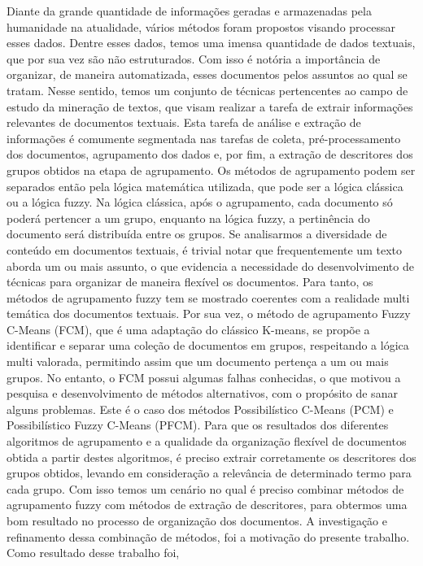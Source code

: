 Diante da grande quantidade de informações geradas e armazenadas pela humanidade na atualidade, 
vários métodos foram propostos visando processar esses dados. Dentre esses dados, temos uma imensa
quantidade de dados textuais, que por sua vez são não estruturados. Com isso é notória a importância de organizar, de maneira automatizada, esses documentos pelos assuntos ao qual se tratam. Nesse sentido, temos um conjunto de técnicas pertencentes ao campo de estudo da mineração de textos, que visam realizar a tarefa de extrair informações relevantes de documentos textuais. Esta tarefa de análise e extração de informações é 
comumente segmentada nas tarefas de coleta, pré-processamento dos documentos, agrupamento dos dados
e, por fim, a extração de descritores dos grupos obtidos na etapa de agrupamento. Os métodos de agrupamento podem ser separados então pela lógica matemática utilizada, que pode ser a lógica clássica ou a lógica fuzzy. Na lógica clássica, após o agrupamento, cada documento só poderá pertencer a um grupo, enquanto na lógica fuzzy, a pertinência do documento será distribuída entre os grupos. 
Se analisarmos a diversidade de conteúdo em documentos textuais, é trivial notar que frequentemente
um texto aborda um ou mais assunto, o que evidencia a necessidade do desenvolvimento de técnicas para
organizar de maneira flexível os documentos. Para tanto, os métodos de agrupamento fuzzy
tem se mostrado coerentes com a realidade multi temática dos documentos textuais. Por sua vez, o método de agrupamento Fuzzy C-Means (FCM), que é uma adaptação do clássico K-means, se propõe a identificar e separar uma coleção de documentos em grupos, respeitando a lógica multi valorada, permitindo assim que um documento pertença a um ou mais grupos. No entanto, o FCM possui algumas falhas conhecidas, o que motivou a pesquisa e desenvolvimento de métodos alternativos, com o propósito de sanar alguns problemas. Este é o caso dos métodos Possibilístico C-Means (PCM) e Possibilístico Fuzzy C-Means (PFCM). 
Para que os resultados dos diferentes algoritmos de agrupamento e a qualidade da organização flexível de documentos obtida a partir destes algoritmos, é preciso extrair corretamente os descritores dos grupos obtidos, levando em 
consideração a relevância de determinado termo para cada grupo. Com isso temos um cenário no qual é 
preciso combinar métodos de agrupamento fuzzy com métodos de extração de descritores, para obtermos
uma bom resultado no processo de organização dos documentos. A investigação e refinamento dessa 
combinação de métodos, foi a motivação do presente trabalho. Como resultado desse trabalho foi,
